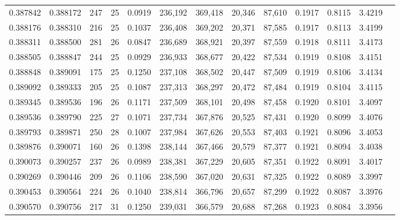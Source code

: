 \begin{tabular}{rrrrrrrrrrrrr}
0.387842 & 0.388172 &   247 &  25 &                                     0.0919 & 236,192 & 369,418 &  20,346 &  87,610 & 0.1917 & 0.8115 & 3.4219 \\
0.388176 & 0.388310 &   216 &  25 &                                     0.1037 & 236,408 & 369,202 &  20,371 &  87,585 & 0.1917 & 0.8113 & 3.4199 \\
0.388311 & 0.388500 &   281 &  26 &                                     0.0847 & 236,689 & 368,921 &  20,397 &  87,559 & 0.1918 & 0.8111 & 3.4173 \\
0.388505 & 0.388847 &   244 &  25 &                                     0.0929 & 236,933 & 368,677 &  20,422 &  87,534 & 0.1919 & 0.8108 & 3.4151 \\
0.388848 & 0.389091 &   175 &  25 &                                     0.1250 & 237,108 & 368,502 &  20,447 &  87,509 & 0.1919 & 0.8106 & 3.4134 \\
0.389092 & 0.389333 &   205 &  25 &                                     0.1087 & 237,313 & 368,297 &  20,472 &  87,484 & 0.1919 & 0.8104 & 3.4115 \\
0.389345 & 0.389536 &   196 &  26 &                                     0.1171 & 237,509 & 368,101 &  20,498 &  87,458 & 0.1920 & 0.8101 & 3.4097 \\
0.389536 & 0.389790 &   225 &  27 &                                     0.1071 & 237,734 & 367,876 &  20,525 &  87,431 & 0.1920 & 0.8099 & 3.4076 \\
0.389793 & 0.389871 &   250 &  28 &                                     0.1007 & 237,984 & 367,626 &  20,553 &  87,403 & 0.1921 & 0.8096 & 3.4053 \\
0.389876 & 0.390071 &   160 &  26 &                                     0.1398 & 238,144 & 367,466 &  20,579 &  87,377 & 0.1921 & 0.8094 & 3.4038 \\
0.390073 & 0.390257 &   237 &  26 &                                     0.0989 & 238,381 & 367,229 &  20,605 &  87,351 & 0.1922 & 0.8091 & 3.4017 \\
0.390269 & 0.390446 &   209 &  26 &                                     0.1106 & 238,590 & 367,020 &  20,631 &  87,325 & 0.1922 & 0.8089 & 3.3997 \\
0.390453 & 0.390564 &   224 &  26 &                                     0.1040 & 238,814 & 366,796 &  20,657 &  87,299 & 0.1922 & 0.8087 & 3.3976 \\
0.390570 & 0.390756 &   217 &  31 &                                     0.1250 & 239,031 & 366,579 &  20,688 &  87,268 & 0.1923 & 0.8084 & 3.3956 \\

\end{tabular}
